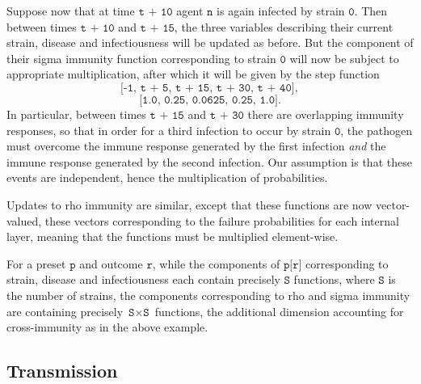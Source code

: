 \documentclass[10pt,letterpaper]{article}
\begin{document}
Suppose now that at time $\texttt{t + 10}$ agent $\texttt{n}$ is again infected by strain $\texttt{0}$. Then between times $\texttt{t + 10}$ and $\texttt{t + 15}$, the three variables describing their current strain, disease and infectiousness will be updated as before. But the component of their sigma immunity function corresponding to strain $\texttt{0}$ will now be subject to appropriate multiplication, after which it will be given by the step function $$\texttt{[-1, t + 5, t + 15, t + 30, t + 40]},$$ $$\texttt{[1.0, 0.25, 0.0625, 0.25, 1.0]}.$$ In particular, between times $\texttt{t + 15}$ and $\texttt{t + 30}$ there are overlapping immunity responses, so that in order for a third infection to occur by strain $\texttt{0}$, the pathogen must overcome the immune response generated by the first infection \textit{and} the immune response generated by the second infection. Our assumption is that these events are independent, hence the multiplication of probabilities.

Updates to rho immunity are similar, except that these functions are now vector-valued, these vectors corresponding to the failure probabilities for each internal layer, meaning that the functions must be multiplied element-wise.

For a preset $\texttt{p}$ and outcome $\texttt{r}$, while the components of $\texttt{p[r]}$ corresponding to strain, disease and infectiousness each contain precisely $\texttt{S}$ functions, where $\texttt{S}$ is the number of strains, the components corresponding to rho and sigma immunity are containing precisely $\texttt{S} \times \texttt{S}$ functions, the additional dimension accounting for cross-immunity as in the above example.

\subsection{Transmission}
\end{document}
